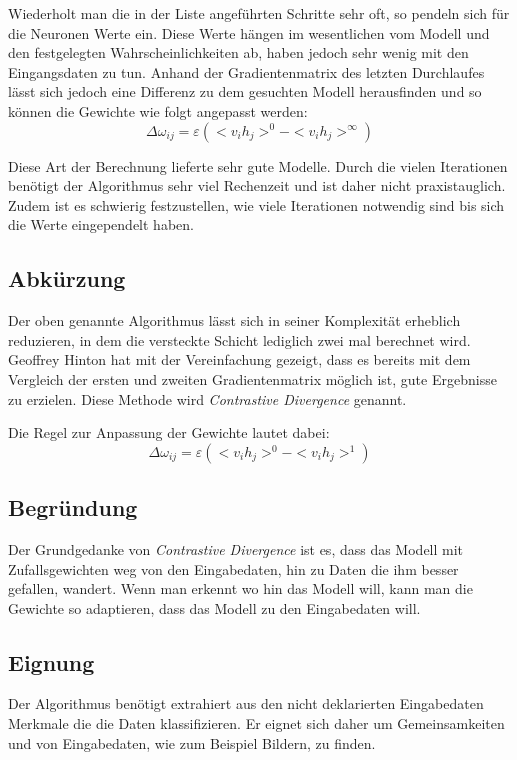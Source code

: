 Wiederholt man die in der Liste angeführten Schritte sehr oft, so pendeln sich für die Neuronen Werte ein. Diese Werte hängen im wesentlichen vom Modell und den festgelegten Wahrscheinlichkeiten ab, haben jedoch sehr wenig mit den Eingangsdaten zu tun. Anhand der Gradientenmatrix des letzten Durchlaufes lässt sich jedoch eine Differenz zu dem gesuchten Modell herausfinden und so können die Gewichte wie folgt angepasst werden:
$$\Delta\omega_{ij} = \varepsilon (<v_ih_j>^0 -  <v_ih_j>^\infty)$$

Diese Art der Berechnung lieferte sehr gute Modelle. Durch die vielen Iterationen benötigt der Algorithmus sehr viel Rechenzeit und ist daher nicht praxistauglich. Zudem ist es schwierig festzustellen, wie viele Iterationen notwendig sind bis sich die Werte eingependelt haben.

\subsection{Abkürzung}

Der oben genannte Algorithmus lässt sich in seiner Komplexität erheblich reduzieren, in dem die versteckte Schicht lediglich zwei mal berechnet wird. Geoffrey Hinton hat mit der Vereinfachung gezeigt, dass es bereits mit dem Vergleich der ersten und zweiten Gradientenmatrix möglich ist, gute Ergebnisse zu erzielen. Diese Methode wird \emph{Contrastive Divergence} genannt.

Die Regel zur Anpassung der Gewichte lautet dabei:
$$\Delta\omega_{ij} = \varepsilon (<v_ih_j>^0 -  <v_ih_j>^1)$$

\subsection{Begründung}

Der Grundgedanke von \emph{Contrastive Divergence} ist es, dass das Modell mit Zufallsgewichten weg von den Eingabedaten, hin zu Daten die ihm besser gefallen, wandert. Wenn man erkennt wo hin das Modell will, kann man die Gewichte so adaptieren, dass das Modell zu den Eingabedaten will.

\subsection{Eignung}

Der Algorithmus benötigt extrahiert aus den nicht deklarierten Eingabedaten Merkmale die die Daten klassifizieren. Er eignet sich daher um Gemeinsamkeiten und von Eingabedaten, wie zum Beispiel Bildern, zu finden.

